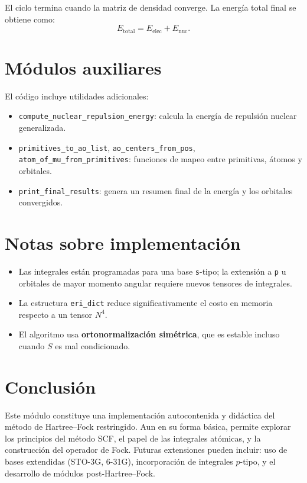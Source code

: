 \documentclass[11pt]{article}
\begin{document}
El ciclo termina cuando la matriz de densidad converge.  
La energía total final se obtiene como:
\[
E_{\text{total}} = E_{\text{elec}} + E_{\text{nuc}}.
\]

\section{Módulos auxiliares}
El código incluye utilidades adicionales:
\begin{itemize}
\item \texttt{compute\_nuclear\_repulsion\_energy}: calcula la energía de repulsión nuclear generalizada.
\item \texttt{primitives\_to\_ao\_list}, \texttt{ao\_centers\_from\_pos}, \texttt{atom\_of\_mu\_from\_primitives}: funciones de mapeo entre primitivas, átomos y orbitales.
\item \texttt{print\_final\_results}: genera un resumen final de la energía y los orbitales convergidos.
\end{itemize}

\section{Notas sobre implementación}
\begin{itemize}
\item Las integrales están programadas para una base \texttt{s}-tipo; 
la extensión a \texttt{p} u orbitales de mayor momento angular requiere nuevos tensores de integrales.
\item La estructura \texttt{eri\_dict} reduce significativamente el costo en memoria respecto a un tensor \(N^4\).
\item El algoritmo usa \textbf{ortonormalización simétrica}, que es estable incluso cuando \(S\) es mal condicionado.
\end{itemize}

\section*{Conclusión}
Este módulo constituye una implementación autocontenida y didáctica del método de Hartree–Fock restringido.
Aun en su forma básica, permite explorar los principios del método SCF, el papel de las integrales atómicas,
y la construcción del operador de Fock. Futuras extensiones pueden incluir:
uso de bases extendidas (STO-3G, 6-31G), incorporación de integrales \(p\)-tipo,
y el desarrollo de módulos post-Hartree–Fock.
\end{document}
